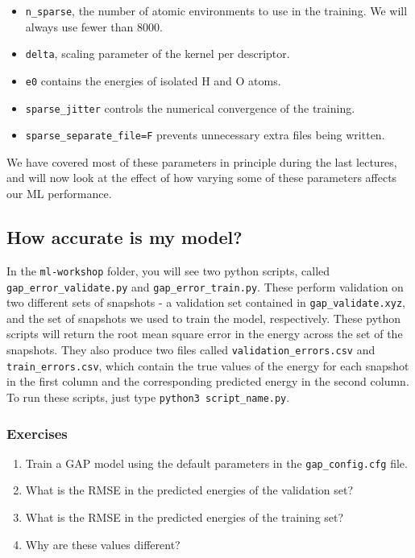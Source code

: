 \documentclass{article}
\begin{document}
\begin{itemize}
\item \verb|n_sparse|, the number of atomic environments to use in the training. We will always use fewer than 8000.
\item \verb|delta|, scaling parameter of the kernel per descriptor.
\item \verb|e0| contains the energies of isolated H and O atoms.
\item \verb|sparse_jitter| controls the numerical convergence of the training.
\item \verb|sparse_separate_file=F| prevents unnecessary extra files being written. 
\end{itemize}

We have covered most of these parameters in principle during the last lectures, and will now look at the effect of how varying some of these parameters affects our ML performance.

\subsection{How accurate is my model?}

In the \verb|ml-workshop| folder, you will see two python scripts, called \verb|gap_error_validate.py| and \verb|gap_error_train.py|. These perform validation on two different sets of snapshots - a validation set contained in \verb|gap_validate.xyz|, and the set of snapshots we used to train the model, respectively. These python scripts will return the root mean square error in the energy across the set of the snapshots. They also produce two files called \verb|validation_errors.csv| and \verb|train_errors.csv|, which contain the true values of the energy for each snapshot in the first column and the corresponding predicted energy in the second column. To run these scripts, just type \verb|python3 script_name.py|.

\subsubsection*{Exercises}

\begin{enumerate}
 
\item Train a GAP model using the default parameters in the \verb|gap_config.cfg| file.
\item What is the RMSE in the predicted energies of the validation set?
\item What is the RMSE in the predicted energies of the training set?
\item Why are these values different?
\end{enumerate}
\end{document}
